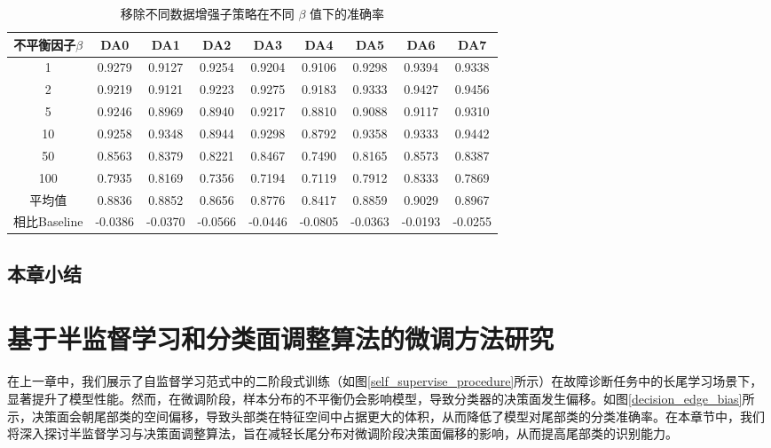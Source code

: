 \documentclass[master]{thesis-uestc}
\begin{document}
\begin{table}[h]
    \caption{移除不同数据增强子策略在不同 $\beta$ 值下的准确率}
    \centering
    \begin{tabular}{ccccccccc}
    \toprule
    不平衡因子$\beta$  & DA0 & DA1 & DA2 & DA3 & DA4 & DA5 & DA6 & DA7 \\
    \midrule
    1   & 0.9279  & 0.9127 & 0.9254 & 0.9204 & 0.9106 & 0.9298 & 0.9394 & 0.9338  \\
    2   & 0.9219  & 0.9121 & 0.9223 & 0.9275 & 0.9183 & 0.9333 & 0.9427 & 0.9456  \\
    5   & 0.9246  & 0.8969 & 0.8940 & 0.9217 & 0.8810 & 0.9088 & 0.9117 & 0.9310  \\
    10  & 0.9258  & 0.9348 & 0.8944 & 0.9298 & 0.8792 & 0.9358 & 0.9333 & 0.9442  \\
    50  & 0.8563  & 0.8379 & 0.8221 & 0.8467 & 0.7490 & 0.8165 & 0.8573 & 0.8387  \\
    100 & 0.7935  & 0.8169 & 0.7356 & 0.7194 & 0.7119 & 0.7912 & 0.8333 & 0.7869  \\
    \midrule
    平均值 & 0.8836  & 0.8852 & 0.8656 & 0.8776 & 0.8417 & 0.8859 & 0.9029 & 0.8967 \\
    \midrule
    相比Baseline & -0.0386 & -0.0370 & -0.0566 & -0.0446 & -0.0805 & -0.0363 & -0.0193 & -0.0255 \\
    \bottomrule
    \end{tabular}
    \label{checkpoint_results_with_avg}
\end{table}



\section{本章小结}

\chapter{基于半监督学习和分类面调整算法的微调方法研究}
在上一章中，我们展示了自监督学习范式中的二阶段式训练（如图\ref{self_supervise_procedure}所示）在故障诊断任务中的长尾学习场景下，显著提升了模型性能。然而，在微调阶段，样本分布的不平衡仍会影响模型，导致分类器的决策面发生偏移。如图\ref{decision_edge_bias}所示，决策面会朝尾部类的空间偏移，导致头部类在特征空间中占据更大的体积，从而降低了模型对尾部类的分类准确率。在本章节中，我们将深入探讨半监督学习与决策面调整算法，旨在减轻长尾分布对微调阶段决策面偏移的影响，从而提高尾部类的识别能力。
\end{document}
